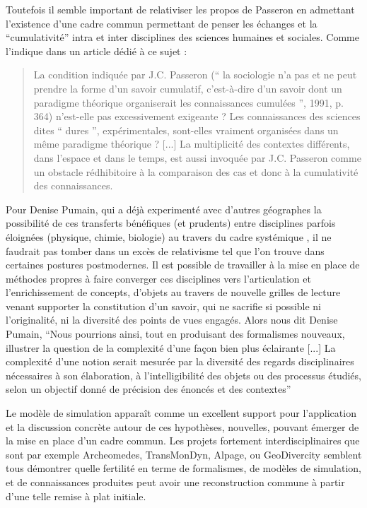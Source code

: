 Toutefois il semble important de relativiser les propos de Passeron en admettant l'existence d'une cadre commun permettant de penser les échanges et la \enquote{cumulativité}  intra et inter disciplines des sciences humaines et sociales. Comme l'indique \textcite{Pumain2005} dans un article dédié à ce sujet :

\blockquote[\cite{Pumain2005}]{La condition indiquée par J.C. Passeron (\enquote{ la sociologie n’a pas et ne peut prendre la forme d’un savoir cumulatif, c’est-à-dire d’un savoir dont un paradigme théorique organiserait les connaissances cumulées }, 1991, p. 364) n’est-elle pas excessivement exigeante ? Les connaissances des sciences dites \enquote{ dures }, expérimentales, sont-elles vraiment organisées dans un même paradigme théorique ? [...] La multiplicité des contextes différents, dans l’espace et dans le temps, est aussi invoquée par J.C. Passeron comme un obstacle rédhibitoire à la comparaison des cas et donc à la cumulativité des connaissances.} 

Pour Denise Pumain, qui a déjà experimenté avec d'autres géographes la possibilité de ces transferts bénéfiques (et prudents) entre disciplines parfois éloignées (physique, chimie, biologie) au travers du cadre systémique \autocites{Pumain1989,Sanders1992, Dastes1998}, il ne faudrait pas tomber dans un excès de relativisme tel que l'on trouve dans certaines postures postmodernes. Il est possible de travailler à la mise en place de méthodes  propres à faire converger ces disciplines vers l'articulation et l'enrichissement de concepts, d'objets au travers de nouvelle grilles de lecture venant supporter la constitution d'un savoir, qui ne sacrifie si possible ni l'originalité, ni la diversité des points de vues engagés. Alors nous dit Denise Pumain, \enquote{Nous pourrions ainsi, tout en produisant des formalismes nouveaux, illustrer la question de la complexité d’une façon bien plus éclairante [...] La complexité d’une notion serait mesurée par la diversité des regards disciplinaires nécessaires à son élaboration, à l’intelligibilité des objets ou des processus étudiés, selon un objectif donné de précision des énoncés et des contextes}

Le modèle de simulation apparaît comme un excellent support pour l'application et la discussion concrète autour de ces hypothèses, nouvelles, pouvant émerger de la mise en place d'un cadre commun. Les projets fortement interdisciplinaires que sont par exemple Archeomedes, TransMonDyn, Alpage, ou GeoDivercity \autocite{Chapron2014} semblent tous démontrer quelle fertilité en terme de formalismes, de modèles de simulation, et de connaissances produites peut avoir une reconstruction commune à partir d'une telle remise à plat initiale.

